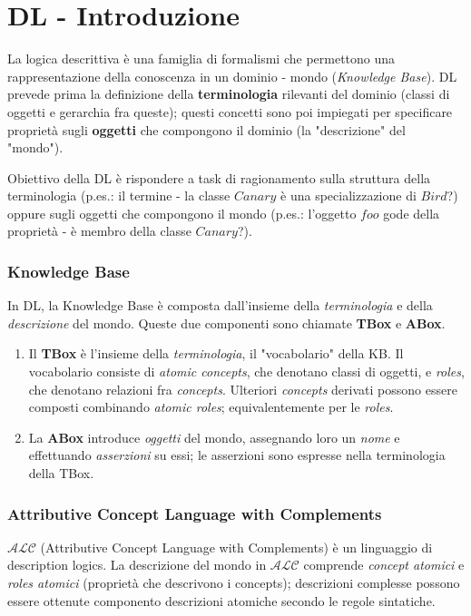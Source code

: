 \chapter{DL - Introduzione}

La logica descrittiva è una famiglia di formalismi che permettono una rappresentazione della conoscenza in un dominio - mondo (\textit{Knowledge Base}). DL prevede prima la definizione della \textbf{terminologia} rilevanti del dominio (classi di oggetti e gerarchia fra queste); questi concetti sono poi impiegati per specificare proprietà sugli \textbf{oggetti} che compongono il dominio (la "descrizione" del "mondo").

Obiettivo della DL è rispondere a task di ragionamento sulla struttura della terminologia (p.es.: il termine - la classe $Canary$ è una specializzazione di $Bird$?) oppure sugli oggetti che compongono il mondo (p.es.: l'oggetto $foo$ gode della proprietà - è membro della classe $Canary$?).

\subsection{Knowledge Base}

In DL, la Knowledge Base è composta dall'insieme della \textit{terminologia} e della \textit{descrizione} del mondo. Queste due componenti sono chiamate \textbf{TBox} e \textbf{ABox}.
\begin{enumerate}
\item Il \textbf{TBox} è l'insieme della \textit{terminologia}, il "vocabolario" della KB. Il vocabolario consiste di \textit{atomic concepts}, che denotano classi di oggetti, e \textit{roles}, che denotano relazioni fra \textit{concepts}. Ulteriori \textit{concepts} derivati possono essere composti combinando \textit{atomic roles}; equivalentemente per le \textit{roles}.
\item La \textbf{ABox} introduce \textit{oggetti} del mondo, assegnando loro un \textit{nome} e effettuando \textit{asserzioni} su essi; le asserzioni sono espresse nella terminologia della TBox.
\end{enumerate}

\subsection{Attributive Concept Language with Complements}
$\mathscr{ALC}$ (Attributive Concept Language with Complements) è un linguaggio di description logics. La descrizione del mondo in $\mathscr{ALC}$ comprende \textit{concept atomici} e \textit{roles atomici} (proprietà che descrivono i concepts); descrizioni complesse possono essere ottenute componento descrizioni atomiche secondo le regole sintatiche.


